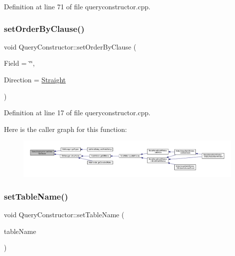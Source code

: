 Definition at line 71 of file queryconstructor.\+cpp.

\hypertarget{classQueryConstructor_a096ed5c85c40851db92a7f45405df4cd}{}\label{classQueryConstructor_a096ed5c85c40851db92a7f45405df4cd} 
\subsubsection{\texorpdfstring{set\+Order\+By\+Clause()}{setOrderByClause()}}
{\footnotesize\ttfamily void Query\+Constructor\+::set\+Order\+By\+Clause (\begin{DoxyParamCaption}\item[{const Q\+String \&}]{Field = {\ttfamily \char`\"{}\char`\"{}},  }\item[{\hyperlink{queryconstructor_8h_a57124e387290311f33f3b54a54930418}{Order\+Type}}]{Direction = {\ttfamily \hyperlink{queryconstructor_8h_a57124e387290311f33f3b54a54930418ada4cdade2120d083fe09b30940e51c12}{Straight}} }\end{DoxyParamCaption})}



Definition at line 17 of file queryconstructor.\+cpp.

Here is the caller graph for this function\+:
\nopagebreak
\begin{figure}[H]
\begin{center}
\leavevmode
\includegraphics[width=350pt]{classQueryConstructor_a096ed5c85c40851db92a7f45405df4cd_icgraph}
\end{center}
\end{figure}
\hypertarget{classQueryConstructor_ad1b13fbc7d8c55e384c992852f755008}{}\label{classQueryConstructor_ad1b13fbc7d8c55e384c992852f755008} 
\subsubsection{\texorpdfstring{set\+Table\+Name()}{setTableName()}}
{\footnotesize\ttfamily void Query\+Constructor\+::set\+Table\+Name (\begin{DoxyParamCaption}\item[{const Q\+String \&}]{table\+Name }\end{DoxyParamCaption})}



